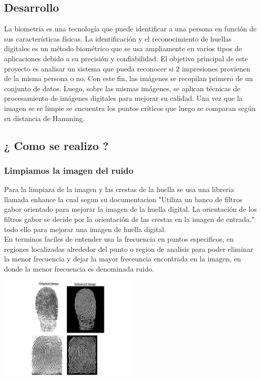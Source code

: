 \documentclass[preprint,12pt]{elsarticle}
\begin{document}
\begin{multicols}{2} 

\section{Desarrollo} 
La biometría es una tecnología que puede identificar a una persona en función de sus características físicas. La identificación y el reconocimiento de huellas digitales es un método biométrico que se usa ampliamente en varios tipos de aplicaciones debido a su precisión y confiabilidad. El objetivo principal de este proyecto es analisar un sistema que pueda reconocer si 2 impresiones provienen de la misma persona o no. Con este fin, las imágenes se recopilan primero de un conjunto de datos. Luego, sobre las mismas imágenes, se aplican técnicas de procesamiento de imágenes digitales para mejorar su calidad. Una vez que la imagen se se limpie se encuentra los puntos críticos que luego se comparan según su distancia de Hamming.

\subsection{¿ Como se realizo ?} 
	\subsubsection{Limpiamos la imagen del ruido} Para la limpiaza de la imagen y las crestas de la huella se usa una libreria llamada enhance la cual segun su documentacion "Utiliza un banco de filtros gabor orientado para mejorar la imagen de la huella digital. La orientación de los filtros gabor se decide por la orientación de las crestas en la imagen de entrada." todo ello para mejorar una imagen de huella digital. \\
En terminos faciles de entender usa la frecuencia en puntos especificos, en regiones localizadas alrededor del punto o region de analisis para poder eliminar la menor frecuencia y dejar la mayor freceuncia encontrada en la imagen, en donde la menor frecuencia es denominada ruido. \\

{\includegraphics[width=0.5\textwidth]{./IMAGENES/ruido}\par}


\end{multicols}
\end{document}

